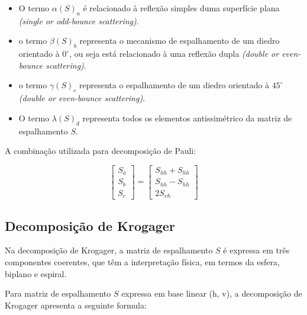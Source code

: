 \documentclass{article}
\begin{document}
\begin{itemize}
    \item O termo $\alpha (S)_{a}$ é relacionado à reflexão simples duma superfície plana \textit{(single or odd-bounce scattering)}.
    
    \item o termo $\beta (S)_{b}$ representa o mecanismo de espalhamento de um diedro orientado à $0^{\circ}$, ou seja está relacionado à uma reflexão dupla \textit{(double or even-bounce scattering)}.
    
    \item o termo $\gamma (S)_{c}$ representa o espalhamento de um diedro orientado à $45^{\circ}$ \textit{(double or even-bounce scattering)}.
    
    \item O termo $\lambda (S)_{d}$ representa todos os elementos antissimétrico da matriz de espalhamento $S$.
\end{itemize}
   
A combinação utilizada para decomposição de Pauli:

\begin{equation}
    \begin{bmatrix}
        S_{a} \\
	    S_{b}\\
	    S_{c}
    \end{bmatrix} = \begin{bmatrix}
        S_{hh} + S_{hh} \\
	    S_{hh} - S_{hh} \\
	    2S_{vh}
    \end{bmatrix}
\end{equation}

\subsection{\textbf{Decomposição de Krogager}}

Na decomposição de Krogager, a matriz de espalhamento $S$ é expressa em três componentes coerentes, que têm a interpretação física, em termos da esfera, biplano e espiral\cite{jong:2009}.

Para matriz de espalhamento $S$ expressa em base linear (h, v), a decomposição de Krogager apresenta a seguinte formula:
\end{document}
